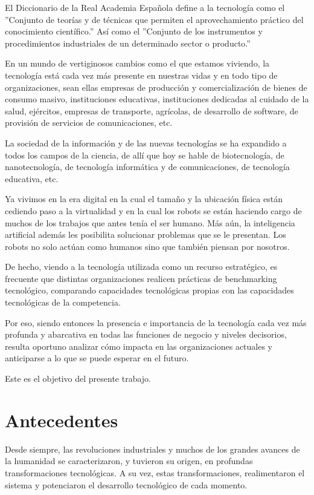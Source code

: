 \documentclass[a4paper, 12pt]{article}
\begin{document}
El Diccionario de la Real Academia Española define a la tecnología como el ''Conjunto de teorías y de técnicas que permiten el aprovechamiento práctico del conocimiento científico.'' Así como el ''Conjunto de los instrumentos y procedimientos industriales de un determinado sector o producto.''

En un mundo de vertiginosos cambios como el que estamos viviendo, la tecnología está cada vez más presente en nuestras vidas y en todo tipo de organizaciones, sean ellas empresas de producción y comercialización de bienes de consumo masivo, instituciones educativas, instituciones dedicadas al cuidado de la salud, ejércitos, empresas de transporte, agrícolas, de desarrollo de software, de provisión de servicios de comunicaciones, etc.

La sociedad de la información y de las nuevas tecnologías se ha expandido a todos los campos de la ciencia, de allí que hoy se hable de biotecnología, de nanotecnología, de tecnología informática y de comunicaciones, de tecnología educativa, etc.

Ya vivimos en la era digital en la cual el tamaño y la ubicación física están cediendo paso a la virtualidad y en la cual los robots se están haciendo cargo de muchos de los trabajos que antes tenía el ser humano. Más aún, la inteligencia artificial además les posibilita solucionar problemas que se le presentan. Los robots no solo actúan como humanos sino que también piensan por nosotros.

De hecho, viendo a la tecnología utilizada como un recurso estratégico, es frecuente que distintas organizaciones realicen prácticas de benchmarking tecnológico, comparando capacidades tecnológicas propias con las capacidades tecnológicas de la competencia.

Por eso, siendo entonces la presencia e importancia de la tecnología cada vez más profunda y abarcativa en todas las funciones de negocio y niveles decisorios, resulta oportuno analizar cómo impacta en las organizaciones actuales y anticiparse a lo que se puede esperar en el futuro.

Este es el objetivo del presente trabajo.

\section{Antecedentes}
\label{sec:Antecedentes}
Desde siempre, las revoluciones industriales y muchos de los grandes avances de la humanidad se caracterizaron, y tuvieron su origen, en profundas transformaciones tecnológicas. A su vez, estas transformaciones, realimentaron el sistema y potenciaron el desarrollo tecnológico de cada momento.
\end{document}
